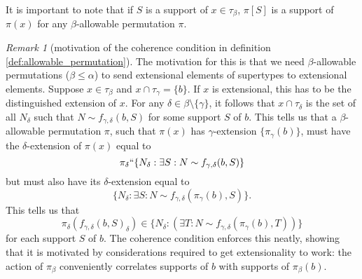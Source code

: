 \documentclass[112pt]{article}
\theoremstyle{definition}
\theoremstyle{remark}
\newtheorem{remark}[theorem]{Remark}
\begin{document}
It is important to note that if $S$ is a support of $x\in \tau_\beta$, $\pi[S]$ is a support of $\pi(x)$ for any $\beta$-allowable permutation $\pi$.

\begin{remark}[motivation of the coherence condition in definition \ref{def:allowable_permutation}]\label{rk:motivate_coherence_condition}
The motivation for this is that we need $\beta$-allowable permutations ($\beta \leq\alpha$) to send extensional elements of supertypes to extensional elements.  Suppose $x \in \tau_\beta$ and
$x \cap \tau_\gamma = \{b\}$.  If $x$ is extensional, this has to be the distinguished extension of $x$.  For any $\delta \in \beta \setminus \{\gamma\}$,
it follows that $x \cap \tau_\delta$ is the set of all $N_\delta$ such that $N \sim f_{\gamma,\delta}(b,S)$ for some support $S$ of $b$.  This tells us that a $\beta$-allowable permutation $\pi$, such that $\pi(x)$ has $\gamma$-extension $\{\pi_\gamma(b)\}$, must have the  $\delta$-extension of $\pi(x)$ equal to $$\pi_\delta``\{N_\delta:\exists S:N \sim f_{\gamma,\delta}(b,S)\}$$
but must also have its $\delta$-extension equal to $$\{N_\delta:\exists S:N \sim f_{\gamma,\delta}(\pi_\gamma(b),S)\}.$$  This tells us that $$\pi_\delta(f_{\gamma,\delta}(b,S)_\delta) \in \{N_\delta:(\exists T:N \sim f_{\gamma,\delta}(\pi_\gamma(b),T))\}$$ for each support $S$ of $b$.  The coherence condition enforces this neatly, showing that it is motivated by considerations required to get extensionality to work: the action of $\pi_\beta$ conveniently correlates supports of $b$ with supports of $\pi_\beta(b)$.

\end{remark}
\end{document}
